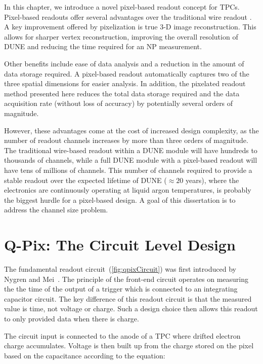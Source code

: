 In this chapter, we introduce a novel pixel-based readout concept for TPCs.
Pixel-based readouts offer several advantages over the traditional wire readout \citep{lartpc_recon_problems_joshi_2015}.
A key improvement offered by pixelization is true 3-D image reconstruction.
This allows for sharper vertex reconstruction, improving the overall resolution of DUNE and reducing the time required for an NP measurement.

Other benefits include ease of data analysis and a reduction in the amount of data storage required.
A pixel-based readout automatically captures two of the three spatial dimensions for easier analysis.
In addition, the pixelated readout method presented here reduces the total data storage required and the data acquisition rate (without loss of accuracy) by potentially several orders of magnitude.

However, these advantages come at the cost of increased design complexity, as the number of readout channels increases by more than three orders of magnitude.
The traditional wire-based readout within a DUNE module will have hundreds to thousands of channels, while a full DUNE module with a pixel-based readout will have tens of millions of channels.
This number of channels required to provide a stable readout over the expected lifetime of DUNE ($\approx 20$ years), where the electronics are continuously operating at liquid argon temperatures, is probably the biggest hurdle for a pixel-based design.
A goal of this dissertation is to address the channel size problem.

\section{Q-Pix: The Circuit Level Design}

The fundamental readout circuit~(\ref{fig:qpixCircuit}) was first introduced by Nygren and Mei~\citep{qpix:nygren:mei}.
The principle of the front-end circuit operates on measuring the the time of the output of a trigger which is connected to an integrating capacitor circuit.
The key difference of this readout circuit is that the measured value is time, not voltage or charge.
Such a design choice then allows this readout to only provided data when there is charge.

The circuit input is connected to the anode of a TPC where drifted electron charge accumulates.
Voltage is then built up from the charge stored on the pixel based on the capacitance according to the equation:

